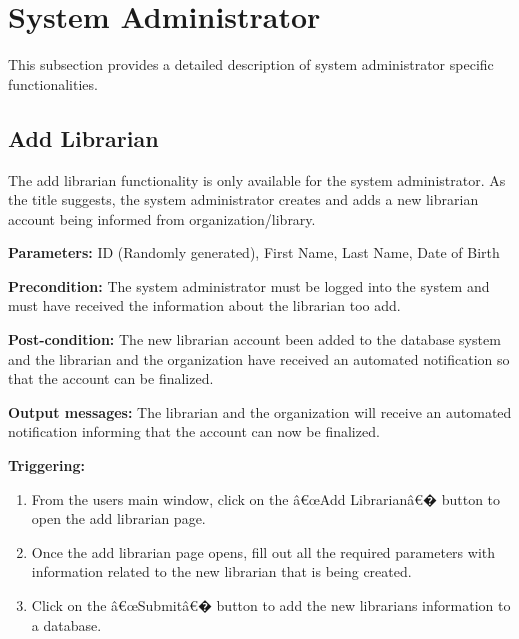 \section{System Administrator}
\label{operation:System Administrator}

This subsection provides a detailed description of system administrator specific functionalities.

\subsection{Add Librarian}

The add librarian functionality is only available for the system administrator. As the title suggests, the system administrator creates and adds a new librarian account being informed from organization/library. 

\begin{description}

\item \textbf{Parameters:} ID (Randomly generated), First Name, Last Name, Date of Birth

\item \textbf{Precondition:} The system administrator must be logged into the system and must have received the information about the librarian too add. 

\item \textbf{Post-condition:} The new librarian account been added to the database system and the librarian and the organization have received an automated notification so that the account can be finalized. 

\item \textbf{Output messages:} The librarian and the organization will receive an automated notification informing that the account can now be finalized. 

\item \textbf{Triggering:}
\begin{enumerate}

\item From the users main window, click on the â€œAdd Librarianâ€� button to open the add librarian page. 

\item Once the add librarian page opens, fill out all the required parameters with information related to the new librarian that is being created. 

\item Click on the â€œSubmitâ€� button to add the new librarians information to a database. 

\end{enumerate}

\end{description}



